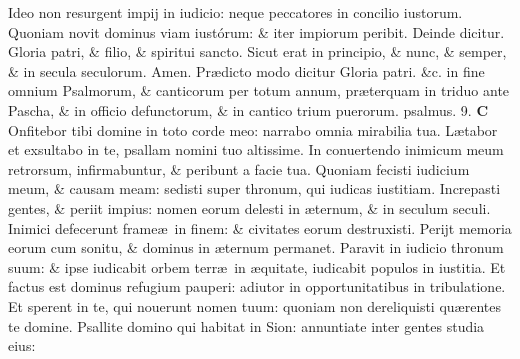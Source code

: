 \documentclass[a5paper,10pt]{book}
\def\ae{æ}
\begin{document}
\begin{multicols*}{2}
\newline \color{red} I\color{black}deo non resurgent impij in iudicio: neque peccatores in concilio iustorum.
\newline \color{red} Q\color{black}uoniam novit dominus viam iustórum: \& iter impiorum peribit.
\color{red} \quad Deinde dicitur. \color{black}
\newline \color{red} G\color{black}loria patri, \& filio, \& spiritui sancto.
\newline \color{red} S\color{black}icut erat in principio, \& nunc, \& semper, \& in secula seculorum. Amen. %
\newline
\color{red} Pr\ae dicto modo dicitur \color{black} Gloria patri. \color{red} \&c. in fine omnium Psalmorum, \& canticorum per totum annum, pr\ae terquam in triduo ante Pascha, \& in officio defunctorum, \& in cantico trium puerorum. \quad psalmus. 9. \color{black}
\lettrine[lines=2]{\bfseries \color{red} C}{}
Onfitebor tibi domine in toto corde meo: narrabo omnia mirabilia tua.
\newline \color{red} L\color{black}\ae tabor et exsultabo in te, psallam nomini tuo altissime.
\newline \color{red} I\color{black}n conuertendo inimicum meum retrorsum, infirmabuntur, \& peribunt a facie tua.
\newline \color{red} Q\color{black}uoniam fecisti iudicium meum, \& causam meam: sedisti super thronum, qui iudicas iustitiam.
\newline \color{red} I\color{black}ncrepasti gentes, \& periit impius: nomen eorum delesti in \ae ternum, \& in seculum seculi.
\newline \color{red} I\color{black}nimici defecerunt frame\ae \ in finem: \& civitates eorum destruxisti.
\newline \color{red} P\color{black}erijt memoria eorum cum sonitu, \& dominus in \ae ternum permanet.
\newline \color{red} P\color{black}aravit in iudicio thronum suum: \& ipse iudicabit orbem terr\ae \ in \ae quitate, iudicabit populos in iustitia.
\newline \color{red} E\color{black}t factus est dominus refugium pauperi: adiutor in opportunitatibus in tribulatione.
\newline \color{red} E\color{black}t sperent in te, qui nouerunt nomen tuum: quoniam non dereliquisti qu\ae rentes te domine.
\newline \color{red} P\color{black}sallite domino qui habitat in Sion: annuntiate inter gentes studia eius:

\end{multicols*}
\end{document}
